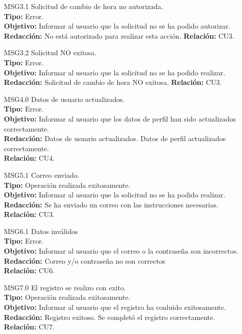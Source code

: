 \begin{itemize}
	 \item[MSG3.1] Solicitud de cambio de hora no autorizada.\\
	 \textbf{Tipo:} Error.\\
	 \textbf{Objetivo:} Informar al usuario que la solicitud no se ha podido autorizar.\\
	 \textbf{Redacción:}  No está autorizado para realizar esta acción.
	 \textbf{Relación:} CU3.
	 
	 \item[MSG3.2] Solicitud NO exitosa.\\
	 \textbf{Tipo:} Error.\\
	 \textbf{Objetivo:} Informar al usuario que la solicitud no se ha podido realizar.\\
	 \textbf{Redacción:} Solicitud de cambio de hora NO exitosa.
	 \textbf{Relación:} CU3.
	 
	 \item[MSG4.0] Datos de usuario actualizados.\\
	 \textbf{Tipo:} Error.\\
	 \textbf{Objetivo:} Informar al usuario que los datos de perfil han sido actualizados correctamente.\\
	 \textbf{Redacción:} Datos de usuario actualizados. Datos de perfil actualizados correctamente.\\
	 \textbf{Relación:} CU4.
	 
	 \item[MSG5.1] Correo enviado.\\
	 \textbf{Tipo:} Operación realizada exitosamente.\\
	 \textbf{Objetivo:} Informar al usuario que la solicitud no se ha podido realizar.\\
	 \textbf{Redacción:} Se ha enviado un correo con las instrucciones necesarias.\\
	 \textbf{Relación:} CU3.
	 
	 \item[MSG6.1] Datos inválidos\\
	 \textbf{Tipo:} Error.\\
	 \textbf{Objetivo:} Informar al usuario que el correo o la contraseña son incorrectos.\\
	 \textbf{Redacción:} Correo y/o contraseña no son correctos  \\
	 \textbf{Relación:} CU6.
	 
	 \item[MSG7.0] El registro se realizo con exito.\\
	 \textbf{Tipo:} Operación realizada exitosamente.\\
	 \textbf{Objetivo:} Informar al usuario que el registro ha conluido exitosamente.\\
	 \textbf{Redacción:} Registro exitoso. Se completó el registro correctamente.
	 \textbf{Relación:} CU7.
	 

\end{itemize}
